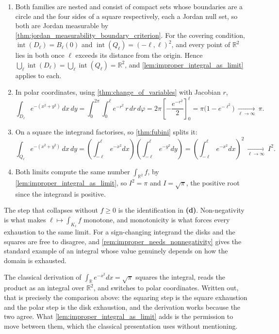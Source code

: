 \begin{exercisesolution}
\label{sol:ai_gaussian_two_exhaustions}
\begin{enumerate}[label=\textbf{(\alph*)}]
  \item Both families are nested and consist of compact sets whose boundaries are a circle
    and the four sides of a square respectively, each a Jordan null set, so both are Jordan
    measurable by \cref{thm:jordan_measurability_boundary_criterion}. For the covering condition,
    $\operatorname{int}(D_\ell) = B_\ell(0)$ and $\operatorname{int}(Q_\ell) = (-\ell,\ell)^2$,
    and every point of $\mathbb{R}^2$ lies in both once $\ell$ exceeds its distance from the
    origin. Hence $\bigcup_\ell\operatorname{int}(D_\ell) =
    \bigcup_\ell\operatorname{int}(Q_\ell) = \mathbb{R}^2$, and
    \cref{lem:improper_integral_as_limit} applies to each.
  \item In polar coordinates, using \cref{thm:change_of_variables} with Jacobian $r$,
    \[\int_{D_\ell} e^{-(x^2+y^2)}\,dx\,dy
      = \int_0^{2\pi}\!\!\int_0^{\ell} e^{-r^2}\,r\,dr\,d\varphi
      = 2\pi\left[-\frac{e^{-r^2}}{2}\right]_0^{\ell} = \pi\big(1 - e^{-\ell^2}\big)
      \ \xrightarrow[\ell\to\infty]{}\ \pi.\]
  \item On a square the integrand factorises, so \cref{thm:fubini} splits it:
    \[\int_{Q_\ell} e^{-(x^2+y^2)}\,dx\,dy
      = \left(\int_{-\ell}^{\ell} e^{-x^2}dx\right)\left(\int_{-\ell}^{\ell} e^{-y^2}dy\right)
      = \left(\int_{-\ell}^{\ell} e^{-x^2}dx\right)^{\!2}
      \ \xrightarrow[\ell\to\infty]{}\ I^2.\]
  \item Both limits compute the same number $\int_{\mathbb{R}^2}f$, by
    \cref{lem:improper_integral_as_limit}, so $I^2 = \pi$ and $I = \sqrt\pi$, the positive root
    since the integrand is positive.
\end{enumerate}

The step that collapses without $f \geq 0$ is the identification in \textbf{(d)}. Non-negativity
is what makes $\ell \mapsto \int_{K_\ell}f$ monotone, and monotonicity is what forces every
exhaustion to the same limit. For a sign-changing integrand the disks and the squares are free to
disagree, and \cref{rem:improper_needs_nonnegativity} gives the standard example of an integral
whose value genuinely depends on how the domain is exhausted.

\begin{remark}
\label{rem:gaussian_two_exhaustions_retro}
The classical derivation of $\int_{\mathbb{R}}e^{-x^2}dx = \sqrt\pi$ squares the integral, reads
the product as an integral over $\mathbb{R}^2$, and switches to polar coordinates. Written out,
that is precisely the comparison above: the squaring step is the square exhaustion and the polar
step is the disk exhaustion, and the derivation works because the two agree. What
\cref{lem:improper_integral_as_limit} adds is the permission to move between them, which the
classical presentation uses without mentioning.
\end{remark}
\end{exercisesolution}

